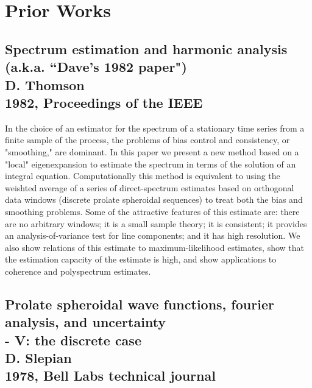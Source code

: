 \documentclass{article}
\begin{document}
{\LARGE\section{Prior Works}}

\subsection{Spectrum estimation and harmonic analysis (a.k.a. ``Dave's 1982 paper")\\
D. Thomson \\
1982, Proceedings of the IEEE}
In the choice of an estimator for the spectrum of a stationary time series from a finite sample of the process, the problems of bias control and consistency, or "smoothing," are dominant. In this paper we present a new method based on a "local" eigenexpansion to estimate the spectrum in terms of the solution of an integral equation. Computationally this method is equivalent to using the weishted average of a series of direct-spectrum estimates based on orthogonal data windows (discrete prolate spheroidal sequences) to treat both the bias and smoothing problems. Some of the attractive features of this estimate are: there are no arbitrary windows; it is a small sample theory; it is consistent; it provides an analysis-of-variance test for line components; and it has high resolution. We also show relations of this estimate to maximum-likelihood estimates, show that the estimation capacity of the estimate is high, and show applications to coherence and polyspectrum estimates. \\


\subsection{Prolate spheroidal wave functions, fourier analysis, and uncertainty \\ \indent - V: the discrete case \\
D. Slepian \\
1978, Bell Labs technical journal}
\end{document}
